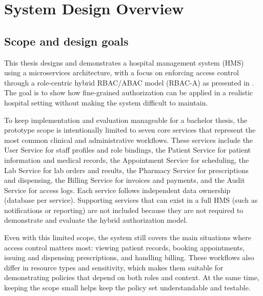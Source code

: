 \section{System Design Overview}

\subsection{Scope and design goals}
This thesis designs and demonstrates a hospital management system (HMS) using a microservices architecture, with a focus on enforcing access control through a role-centric hybrid RBAC/ABAC model (RBAC-A) as presented in \cite{KuhnCoyneWeil2010}. The goal is to show how fine-grained authorization can be applied in a realistic hospital setting without making the system difficult to maintain.
\vspace{0.5cm}


To keep implementation and evaluation manageable for a bachelor thesis, the prototype scope is intentionally limited to seven core services that represent the most common clinical and administrative workflows. These services include the User Service for staff profiles and role bindings, the Patient Service for patient information and medical records, the Appointment Service for scheduling, the Lab Service for lab orders and results, the Pharmacy Service for prescriptions and dispensing, the Billing Service for invoices and payments, and the Audit Service for access logs. Each service follows independent data ownership (database per service). Supporting services that can exist in a full HMS (such as notifications or reporting) are not included because they are not required to demonstrate and evaluate the hybrid authorization model.
\vspace{0.5cm}


Even with this limited scope, the system still covers the main situations where access control matters most: viewing patient records, booking appointments, issuing and dispensing prescriptions, and handling billing. These workflows also differ in resource types and sensitivity, which makes them suitable for demonstrating policies that depend on both roles and context. At the same time, keeping the scope small helps keep the policy set understandable and testable.

